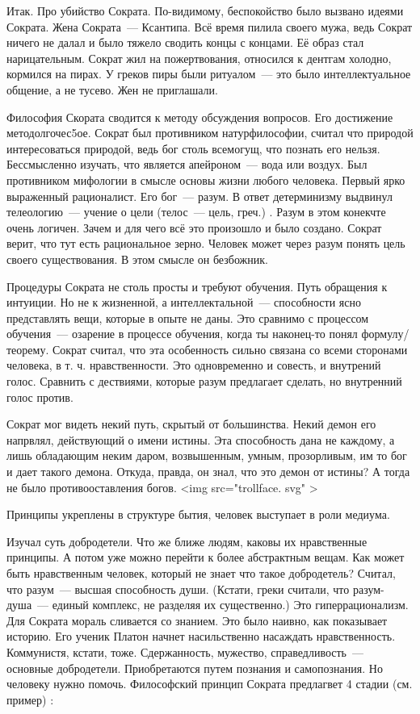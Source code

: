 Итак. Про убийство Сократа. По-видимому, беспокойство было вызвано идеями Сократа. 
Жена Сократа~--- Ксантипа. Всё время пилила своего мужа, ведь Сократ ничего не далал и было тяжело сводить концы с концами. Её образ стал нарицательным. 
Сократ жил на пожертвования, относился к дентгам холодно, кормился на пирах. У греков пиры были ритуалом~--- это было интеллектуальное общение, а не тусево. Жен не приглашали. 

Философия Скората сводится к методу обсуждения вопросов. Его достижение методолгочес5ое. 
Сократ был противником натурфилософии, считал что природой интересоваться природой, ведь бог столь всемогущ, что познать его нельзя. Бессмысленно изучать, что является апейроном~--- вода или воздух. 
Был противником мифологии в смысле основы жизни любого человека. Первый ярко выраженный рационалист. Его бог~--- разум. В ответ детерминизму выдвинул телеологию~--- учение о цели (телос~--- цель, греч.) . 
Разум в этом конекчте очень логичен. Зачем и для чего всё это произошло и было создано. Сократ верит, что тут есть рациональное зерно. Человек может через разум понять цель своего существования. В этом смысле он безбожник. 

Процедуры Сократа не столь просты и требуют обучения. Путь обращения к интуиции. Но не к жизненной, а интеллектальной~--- способности ясно представлять вещи, которые в опыте не даны. 
Это сравнимо с процессом обучения~--- озарение в процессе обучения, когда ты наконец-то понял формулу/теорему. Сократ считал, что эта особенность сильно связана со всеми сторонами человека, в т. ч. нравственности. 
Это одновременно и совесть, и внутрений голос. Сравнить с дествиями, которые разум предлагает сделать, но внутренний голос против. 

Сократ мог видеть некий путь, скрытый от большинства. Некий демон его напрвлял, действующий о имени истины. Эта способность дана не каждому, а лишь обладающим неким даром, возвышенным, умным, прозорливым, им то бог и дает такого демона. 
Откуда, правда, он знал, что это демон от истины? А тогда не было противооставления богов. <img src="trollface. svg" >

Принципы укреплены в структуре бытия, человек выступает в роли медиума. 

Изучал суть добродетели. Что же ближе людям, каковы их нравственные принципы. А потом уже можно перейти к более абстрактным вещам. 
Как может быть нравственным человек, который не знает что такое добродетель? Считал, что разум~--- высшая способность души. (Кстати, греки считали, что разум-душа~--- единый комплекс, не разделяя их существенно.) Это гиперрационализм. 
Для Сократа мораль сливается со знанием. Это было наивно, как показывает историю. Его ученик Платон начнет насильственно насаждать нравственность. Коммунистя, кстати, тоже. 
Сдержанность, мужество, справедливость~--- основные добродетели. Приобретаются путем познания и самопознания. Но человеку нужно помочь. 
Философский принцип Сократа предлагвет 4 стадии (см. пример) :

